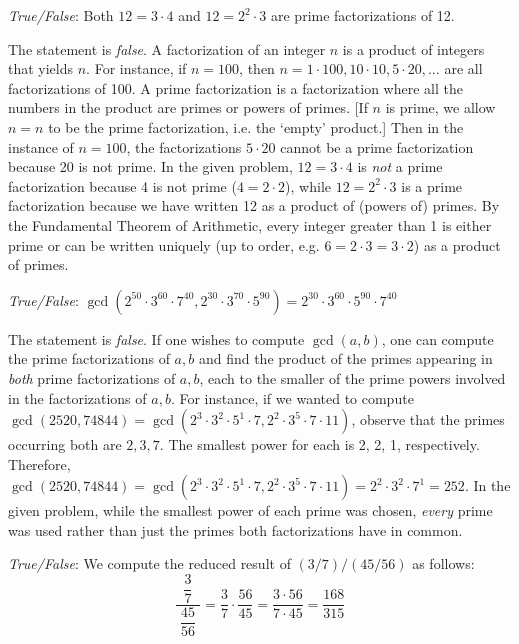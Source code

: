 \documentclass[11pt,letterpaper]{article}
\begin{document}
\thispagestyle{title}


\quizsol \textit{True/False}: Both $12= 3 \cdot 4$ and $12= 2^2 \cdot 3$ are prime factorizations of 12.  \pspace

\sol The statement is \textit{false}. A factorization of an integer $n$ is a product of integers that yields $n$. For instance, if $n= 100$, then $n= 1 \cdot 100, 10 \cdot 10, 5 \cdot 20, \ldots$ are all factorizations of 100. A prime factorization is a factorization where all the numbers in the product are primes or powers of primes. [If $n$ is prime, we allow $n= n$ to be the prime factorization, i.e. the `empty' product.] Then in the instance of $n= 100$, the factorizations $5 \cdot 20$ cannot be a prime factorization because 20 is not prime. In the given problem, $12= 3 \cdot 4$ is \textit{not} a prime factorization because 4 is not prime ($4= 2 \cdot 2$), while $12= 2^2 \cdot 3$ is a prime factorization because we have written 12 as a product of (powers of) primes. By the Fundamental Theorem of Arithmetic, every integer greater than 1 is either prime or can be written uniquely (up to order, e.g. $6= 2 \cdot 3= 3 \cdot 2$) as a product of primes. \pvspace{1.5cm}



\quizsol \textit{True/False}: $\gcd(2^{50} \cdot 3^{60} \cdot 7^{40}, 2^{30} \cdot 3^{70} \cdot 5^{90})= 2^{30} \cdot 3^{60} \cdot 5^{90} \cdot 7^{40}$ \pspace

\sol The statement is \textit{false}. If one wishes to compute $\gcd(a, b)$, one can compute the prime factorizations of $a, b$ and find the product of the primes appearing in \textit{both} prime factorizations of $a, b$, each to the smaller of the prime powers involved in the factorizations of $a, b$. For instance, if we wanted to compute $\gcd(2520, 74844)= \gcd(2^3 \cdot 3^2 \cdot 5^1 \cdot 7, 2^2 \cdot 3^5 \cdot 7 \cdot 11)$, observe that the primes occurring both are $2, 3, 7$. The smallest power for each is 2, 2, 1, respectively. Therefore, $\gcd(2520, 74844)= \gcd(2^3 \cdot 3^2 \cdot 5^1 \cdot 7, 2^2 \cdot 3^5 \cdot 7 \cdot 11)= 2^2 \cdot 3^2 \cdot 7^1= 252$. In the given problem, while the smallest power of each prime was chosen, \textit{every} prime was used rather than just the primes both factorizations have in common. \pvspace{1.5cm}



\quizsol \textit{True/False}: We compute the reduced result of $(3/7)/(45/56)$ as follows: 
	\[
	\dfrac{\;\;\dfrac{3}{7}\;\;}{\dfrac{45}{56}}= \dfrac{3}{7} \cdot \dfrac{56}{45}= \dfrac{3 \cdot 56}{7 \cdot 45}= \dfrac{168}{315}
	\] \pspace
\end{document}
